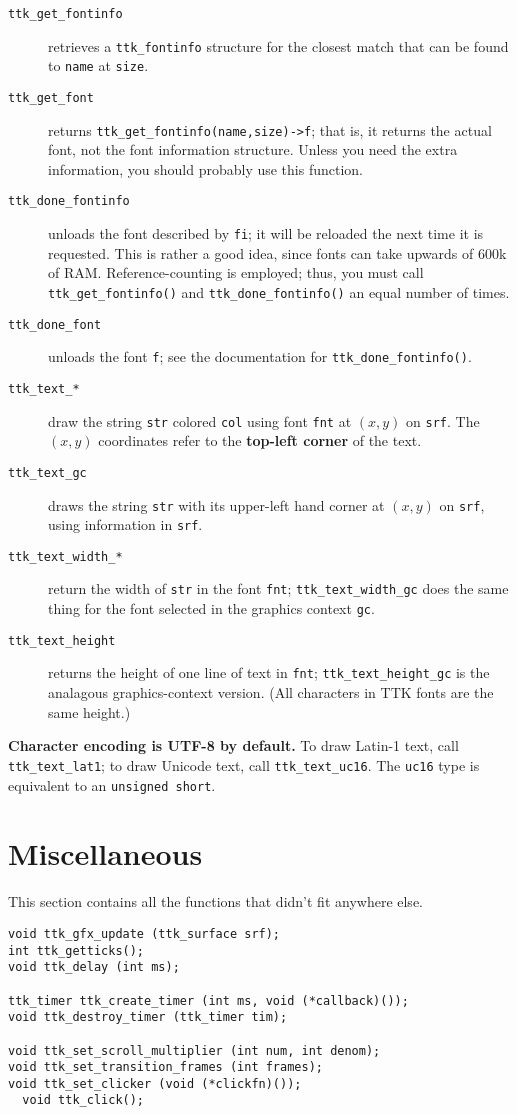 \documentclass[12pt,letterpaper]{report}
\let\ttt\tt
\def\tt{\def\_{{\ttt\char`\_}}\ttt}
\begin{document}
\begin{description}
\item[{\tt ttk_get_fontinfo}] retrieves a \verb|ttk_fontinfo| structure for the closest match that
can be found to \verb|name| at \verb|size|.
\item[{\tt ttk_get_font}] returns \verb|ttk_get_fontinfo(name,size)->f|; that is, it returns the
actual font, not the font information structure. Unless you need the extra information, you should
probably use this function.
\item[{\tt ttk_done_fontinfo}] unloads the font described by \verb|fi|; it will be reloaded the next time
it is requested. This is rather a good idea, since fonts can take upwards of 600k of RAM. Reference-counting is
employed; thus, you must call \verb|ttk_get_fontinfo()| and \verb|ttk_done_fontinfo()| an equal number of times.
\item[{\tt ttk_done_font}] unloads the font \verb|f|; see the documentation for \verb|ttk_done_fontinfo()|.
\item[{\tt ttk_text_*}] draw the string \verb|str| colored \verb|col| using font \verb|fnt| at $(x,y)$ on \verb|srf|.
The $(x,y)$ coordinates refer to the {\bf top-left corner} of the text.
\item[{\tt ttk_text_gc}] draws the string \verb|str| with its upper-left hand corner at $(x,y)$ on \verb|srf|,
using information in \verb|srf|.
\item[{\tt ttk_text_width_*}] return the width of \verb|str| in the font \verb|fnt|; \verb|ttk_text_width_gc|
does the same thing for the font selected in the graphics context \verb|gc|.
\item[{\tt ttk_text_height}] returns the height of one line of text in \verb|fnt|; \verb|ttk_text_height_gc|
is the analagous graphics-context version. (All characters in TTK fonts are the same height.)
\end{description}

{\bf Character encoding is UTF-8 by default.} To draw Latin-1 text, call \verb|ttk_text_lat1|; to draw
Unicode text, call \verb|ttk_text_uc16|. The \verb|uc16| type is equivalent to an \verb|unsigned short|.

\section{Miscellaneous}
This section contains all the functions that didn't fit anywhere else.

\begin{verbatim}
void ttk_gfx_update (ttk_surface srf);
int ttk_getticks();
void ttk_delay (int ms);

ttk_timer ttk_create_timer (int ms, void (*callback)());
void ttk_destroy_timer (ttk_timer tim);

void ttk_set_scroll_multiplier (int num, int denom);
void ttk_set_transition_frames (int frames);
void ttk_set_clicker (void (*clickfn)());
  void ttk_click();
\end{verbatim}
\end{document}
